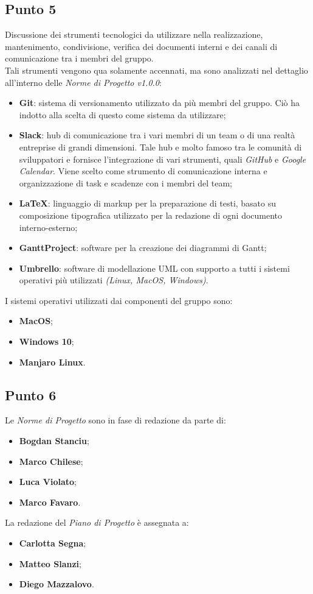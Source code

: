 \subsection{Punto 5}
Discussione dei strumenti tecnologici da utilizzare nella realizzazione, mantenimento, condivisione, verifica dei documenti interni e dei canali di comunicazione tra i membri del gruppo. \\
Tali strumenti vengono qua solamente accennati, ma sono analizzati nel dettaglio  all'interno delle \textit{Norme di Progetto v1.0.0}:
\begin{itemize}
	\item \textbf{Git}: sistema di versionamento utilizzato da più membri del gruppo. Ciò ha indotto alla scelta di questo come sistema da utilizzare; 
	\item \textbf{Slack}: hub di comunicazione tra i vari membri di un team o di una realtà entreprise di grandi dimensioni. Tale hub e molto famoso tra le comunità di sviluppatori e fornisce l'integrazione di vari strumenti, quali  				\textit{GitHub} e \textit{Google Calendar}. Viene scelto come strumento di comunicazione interna e organizzazione di task e scadenze con i membri del team; 
	\item \textbf{LaTeX}: linguaggio di markup per la preparazione di testi, basato su  composizione tipografica utilizzato per la redazione di ogni documento interno-esterno; 
	\item \textbf{GanttProject}: software per la creazione dei diagrammi di Gantt;
	\item \textbf{Umbrello}: software di modellazione UML con supporto a tutti i sistemi operativi più utilizzati \textit{(Linux, MacOS, Windows)}.
\end{itemize}

I sistemi operativi utilizzati dai componenti del gruppo sono:
\begin{itemize}
	\item \textbf{MacOS};
	\item \textbf{Windows 10};
	\item \textbf{Manjaro Linux}.
\end{itemize}

\subsection{Punto 6}
Le \textit{Norme di Progetto} sono in fase di redazione da parte di: 
\begin{itemize}
	\item \textbf{Bogdan Stanciu};
	\item \textbf{Marco Chilese};
	\item \textbf{Luca Violato};
	\item \textbf{Marco Favaro}.
\end{itemize}

La redazione del \textit{Piano di Progetto} è assegnata a:
\begin{itemize}
	\item \textbf{Carlotta Segna};
	\item \textbf{Matteo Slanzi};
	\item \textbf{Diego Mazzalovo}.
\end{itemize}

